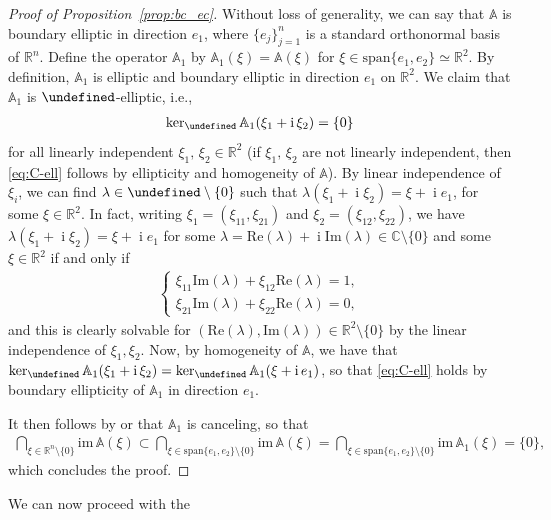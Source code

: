\documentclass[a4paper,10pt]{amsart}
\let\C\undefined
\newcommand{\R}{\mathbb R}
\newcommand{\imag}{\operatorname{i}}
\newcommand{\A}{\mathbb{A}}
\newcommand{\C}{\mathbb{C}}
\numberwithin{equation}{section}
\theoremstyle{remark}
\numberwithin{equation}{section}
\begin{document}
	\begin{proof}[Proof of Proposition~\ref{prop:bc_ec}]
		Without loss of generality, we can say that $\A$ is boundary elliptic in direction $e_1$, where $\{e_j\}_{j=1}^n$ is a standard orthonormal basis of $\R^n$. Define the operator $\A_1$ by $\A_1(\xi)=\A(\xi)$ for $\xi\in\mathrm{span}\{e_1,e_2\}\simeq\R^2$. By definition, $\A_1$ is elliptic and boundary elliptic in direction $e_1$ on $\R^2$. We claim that $\A_1$ is $\C$-elliptic, i.e.,
		\begin{align}\label{eq:C-ell}
			\ker_\C \A_1(\xi_1+\imag \xi_2)=\{0\}
		\end{align}
		for all linearly independent $\xi_1,\,\xi_2\in\R^2$ (if $\xi_1,\,\xi_2$ are not linearly independent, then \eqref{eq:C-ell} follows by ellipticity and homogeneity of $\A$). By linear independence of $\xi_i$, we can find $\lambda\in\C\setminus\{0\}$ such that $\lambda(\xi_1+\imag\xi_2)=\xi+\imag e_1$, for some $\xi\in\R^2$. In fact, writing $\xi_{1}=(\xi_{11},\xi_{21})$ and $\xi_{2}=(\xi_{12},\xi_{22})$, we have $\lambda(\xi_1+\imag\xi_2)=\xi+\imag e_1$ for some $\lambda=\mathrm{Re}(\lambda)+\imag\mathrm{Im}(\lambda)\in\mathbb{C}\setminus\{0\}$ and some $\xi\in\R^{2}$ if and only if 
		\begin{align*}
			\begin{cases}
				\xi_{11}\mathrm{Im}(\lambda)+\xi_{12}\mathrm{Re}(\lambda) = 1, \\ 
				\xi_{21}\mathrm{Im}(\lambda)+\xi_{22}\mathrm{Re}(\lambda) = 0, 
			\end{cases}
		\end{align*}
		and this is clearly solvable for $(\mathrm{Re}(\lambda),\mathrm{Im}(\lambda))\in\R^{2}\setminus\{0\}$ by the linear independence of $\xi_{1},\xi_{2}$. Now, by homogeneity of $\A$, we have that $\ker_\C\A_{1}(\xi_1+\imag\xi_2)=\ker_\C\A_{1}(\xi+\imag e_1)$, so that \eqref{eq:C-ell} holds by boundary ellipticity of $\A_1$ in direction $e_1$.
		
		It then follows by \cite[Lem.~3.2]{GR} or \cite{GRVS} that $\A_1$ is canceling, so that
		\begin{align*}
			\bigcap_{\xi\in\R^n\setminus\{0\}}\mathrm{im\,}\A(\xi)
			\subset\bigcap_{\xi\in\mathrm{span}\{e_1,e_2\}\setminus\{0\}}\mathrm{im\,}\A(\xi)
			=\bigcap_{\xi\in\mathrm{span}\{e_1,e_2\}\setminus\{0\}}\mathrm{im\,}\A_1(\xi)
			=\{0\},
		\end{align*}
		which concludes the proof.
	\end{proof}
	We can now proceed with the
\end{document}
